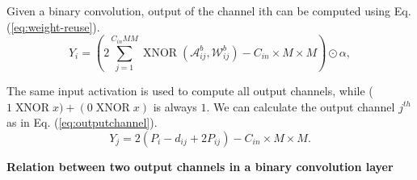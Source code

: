 \documentclass[landscape,a0paper,fontscale=0.292]{baposter}
\newcommand{\subheadercolor}{black}
\DeclareMathOperator*{\XNOR}{XNOR}
\begin{document}
\begin{poster}
{\begin{minipage}[t]{0.55\linewidth}
        Given a binary convolution, output of the channel ith can be computed using Eq. (\ref{eq:weight-reuse}).
        \begin{equation}
        	\label{eq:weight-reuse}
        	Y_i = (2\sum_{j=1}^{C_{in}MM}\XNOR(\mathcal{A}^b_{ij},\mathcal{W}^b_{ij}) - C_{in}\times M\times M) \odot \alpha,
        \end{equation}
        
        The same input activation is used to compute all output channels, while ($1 \XNOR x) + (0 \XNOR x)$ is always $1$. We can calculate the output channel $j^{th}$ as in Eq. (\ref{eq:outputchannel}).
        \begin{equation}
        	\label{eq:outputchannel}
        	Y_j = 2(P_i - d_{ij} + 2P_{ij})-C_{in}\times M\times M .
        \end{equation} 
       
        
    \end{minipage}
    \hfill
    \begin{minipage}[t]{0.45\linewidth}
        \textbf{\color{\subheadercolor}Relation between two output channels in a binary convolution layer}


\end{minipage}}
\end{poster}
\end{document}
